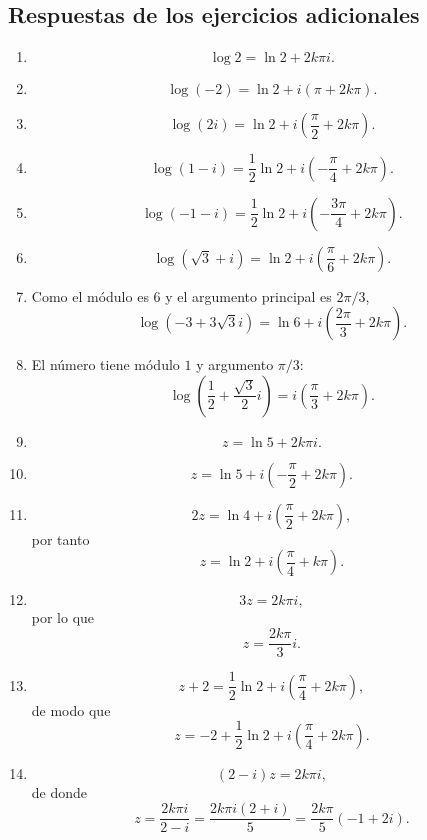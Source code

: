 \documentclass[12pt]{article}
\begin{document}
\subsection*{Respuestas de los ejercicios adicionales}
\begin{enumerate}
\item
\[
\boxed{\log2=\ln2+2k\pi i.}
\]

\item
\[
\boxed{\log(-2)=\ln2+i(\pi+2k\pi).}
\]

\item
\[
\boxed{\log(2i)=\ln2+i\left(\frac{\pi}{2}+2k\pi\right).}
\]

\item
\[
\boxed{
\log(1-i)=\frac12\ln2
+i\left(-\frac{\pi}{4}+2k\pi\right).
}
\]

\item
\[
\boxed{
\log(-1-i)=\frac12\ln2
+i\left(-\frac{3\pi}{4}+2k\pi\right).
}
\]

\item
\[
\boxed{
\log(\sqrt3+i)
=\ln2+i\left(\frac{\pi}{6}+2k\pi\right).
}
\]

\item Como el módulo es $6$ y el argumento principal es $2\pi/3$,
\[
\boxed{
\log(-3+3\sqrt3 i)
=\ln6+i\left(\frac{2\pi}{3}+2k\pi\right).
}
\]

\item El número tiene módulo $1$ y argumento $\pi/3$:
\[
\boxed{
\log\left(\frac12+\frac{\sqrt3}{2}i\right)
=i\left(\frac{\pi}{3}+2k\pi\right).
}
\]

\item
\[
\boxed{z=\ln5+2k\pi i.}
\]

\item
\[
\boxed{
z=\ln5+i\left(-\frac{\pi}{2}+2k\pi\right).
}
\]

\item
\[
2z=\ln4+i\left(\frac{\pi}{2}+2k\pi\right),
\]
por tanto
\[
\boxed{
z=\ln2+i\left(\frac{\pi}{4}+k\pi\right).
}
\]

\item
\[
3z=2k\pi i,
\]
por lo que
\[
\boxed{z=\frac{2k\pi}{3}i.}
\]

\item
\[
z+2=\frac12\ln2+i\left(\frac{\pi}{4}+2k\pi\right),
\]
de modo que
\[
\boxed{
z=-2+\frac12\ln2
+i\left(\frac{\pi}{4}+2k\pi\right).
}
\]

\item
\[
(2-i)z=2k\pi i,
\]
de donde
\[
z=\frac{2k\pi i}{2-i}
=\frac{2k\pi i(2+i)}5
=\boxed{\frac{2k\pi}{5}(-1+2i)}.
\]


\end{enumerate}
\end{document}
